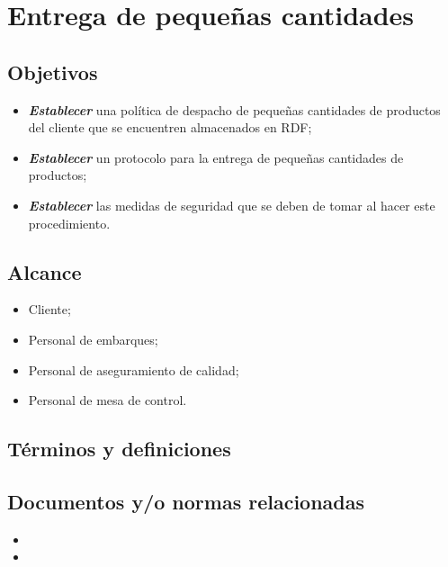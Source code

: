 \thispagestyle{formato-PI}
\renewcommand{\MayorVer}{2}
\renewcommand{\MenorVer}{0}
\renewcommand{\FechaPub}{2023--01}
\renewcommand{\TipoID}{PRO}

\renewcommand{\Titulo}{Entrega de pequeñas cantidades}
\section{\Titulo}
\renewcommand{\Codigo}{\Prog--\thesection--\TipoID}

\subsection{Objetivos}

\begin{itemize}
	\item \emph{\textbf{Establecer}} una política de despacho de pequeñas cantidades de productos del cliente que se encuentren almacenados en RDF;
	\item \emph{\textbf{Establecer}} un protocolo para la entrega de pequeñas cantidades de productos;
	\item \emph{\textbf{Establecer}} las medidas de seguridad que se deben de tomar al hacer este procedimiento.
\end{itemize}

\subsection{Alcance}

\begin{itemize}
	\item Cliente;
	\item Personal de embarques;
	\item Personal de aseguramiento de calidad;
	\item Personal de mesa de control.
\end{itemize}

\subsection{Términos y definiciones}

\begin{description}
\end{description}

\subsection{Documentos y/o normas relacionadas}
\begin{itemize}
	\item {}
	\item {}
\end{itemize}

